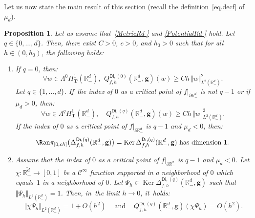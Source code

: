 \documentclass[JEP,XML,SOM,Unicode,NoEqCountersInSection,NoFloatCountersInSection,published]{cedram}
\newenvironment{enumeratei}
{\bgroup\def\theenumi{\roman{enumi}}\def\theenumii{\arabic{enumii}}\begin{enumerate}}
{\end{enumerate}\egroup}
\newcommand{\quand}{\quad\text{and}\quad}
\newcommand{\mbf}[1]{\mathbf{#1}}
\let\pa\partial
\DeclareMathOperator\Ker{Ker}
\theoremstyle{plain}
\newtheorem{proposition}{Proposition}
\theoremstyle{definition}
\begin{document}
Let us now state the main result of this section (recall the
definition~\eqref{eq.decf} of $\mu_d$).

\begin{proposition}\label{pr.prop-loca1-case1}
Let us assume that~\ref{MetricRd-} and \ref{PotentialRd-}
hold. Let $q\in \{0,\ldots,d\}$. Then, there exist $C>0$, $c>0$,
and $h_0>0$ such that for all $h\in (0,h_0)$, the following holds:
\begin{enumeratei}
\item\label{pr.prop-loca1-case1i}
If $q=0$, then:
\begin{equation}\label{eq.last1-case1}
\forall w\in \Lambda^0 H^1_{\mbf T}(\mathbb R^d_-), \ \, Q_{f,h}^{\mathsf{Di},(0)}(\mathbb R^d_-,\mbf g)(w)\ge Ch\, \Vert w \Vert_{L^2(\mathbb R^d_-)}^2.
\end{equation}
Let $q\in \{1,\ldots,d\}$. If~the index of $0$ as a critical point of
$f|_{\pa \mathbb R^d_-}$ is not $q-1$ or if $\mu_{d}>0$, then:
\begin{equation}\label{eq.last2-case1}
\forall w\in \Lambda^q H^1_{\mbf T}(\mathbb R^d_-), \quad Q_{f,h}^{\mathsf{Di},(q)}(\mathbb R^d_-,\mbf g)(w)\ge Ch\, \Vert w \Vert_{L^2(\mathbb R^d_-)}^2.
\end{equation}
If the index of $0$ as a critical point of $f|_{\pa \mathbb R^d_-}$
is $q-1$ and $\mu_{d}<0$, then:
\begin{equation}\label{eq.last3-case1}
\Ran \pi_{[0,ch]}\bigl(\Delta_{f,h}^{\mathsf{Di},(q)}(\mathbb R_-^d,\mbf g)\bigr)=\Ker \Delta_{f,h}^{\mathsf{Di},(q)}(\mathbb R_-^d,\mbf g) \text{ has dimension } 1.
\end{equation}
\item\label{pr.prop-loca1-case1ii}
Assume that the index of $0$ as a critical point of $f|_{\pa \mathbb R^d_-}$
is $q-1$ and $\mu_{d}<0$. Let $\chi: \overline{\mathbb R^{d}_-}\to [0,1]$ be a $\mathcal C^\infty$ function supported in a neighborhood of $0$ which equals~$1$ in a neighborhood of $0$.
Let $\Psi_h\in \Ker \Delta_{f,h}^{\mathsf{Di},(q)}(\mathbb R_-^d,\mbf g)$ such that $ \Vert \Psi_h \Vert_{L^2(\mathbb R^d_-)}=1$. Then,
in~the limit $h\to 0$, it~holds:
\begin{equation}\label{eq.norme-case1}
\ \Vert \chi \Psi_h \Vert_{L^2(\mathbb R^d_-)} =1+O (h^{2}) \ \quand \ Q_{f,h}^{\mathsf{Di},(q)}(\mathbb R^d_-,\mbf g)(\chi \Psi_h)=O(h^{2}).
\end{equation}
\end{enumeratei}
\end{proposition}
\end{document}
